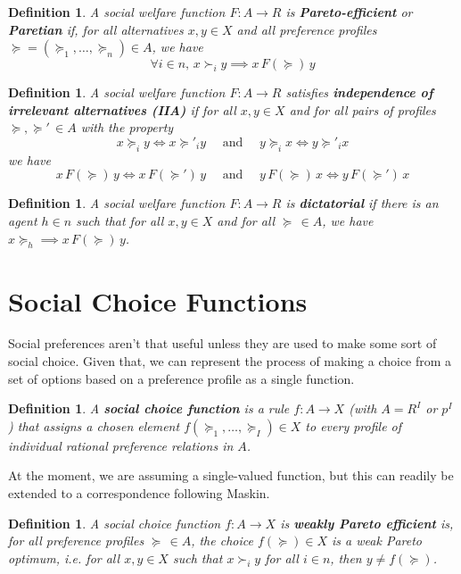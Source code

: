 \documentclass[letter, 10pt]{article}
\newtheorem{definition}[theorem]{Definition}
\theoremstyle{definition}
\begin{document}
\begin{spacing}{1.1}
\begin{definition}
  A social welfare function $F:A\to R$ is
  \textbf{Pareto-efficient} or
  \textbf{Paretian} if, for all alternatives
  $x,y \in X$ and all preference profiles
  $\succeq=(\succeq_1, \ldots, \succeq_n)\in A$, we have \[\forall
  i\in n, \, x \succ_i y \implies x \, F(\succeq) \, y\]
\end{definition}

\begin{definition}
  A social welfare function $F:A\to R$ satisfies
  \textbf{independence of irrelevant alternatives (IIA)}  if for
  all $x,y \in X$ and for all pairs of profiles
  $\succeq , \succeq'\, \in A$ with the property \[x\succeq_i y
  \iff x\succeq'_i y \quad\text{ and }\quad y \succeq_i x \iff y
  \succeq'_i x\] we have \[x\, F(\succeq) \, y \iff x
  \,F(\succeq')\, y \quad\text{ and }\quad y\, F(\succeq) \, x \iff y
  \,F(\succeq')\, x\]
\end{definition}

\begin{definition}
  A social welfare function $F: A\to R$ is
  \textbf{dictatorial} if there is an agent $h\in n$ such
  that for all $x,y \in X$ and for all $\succeq \,\in A$, we
  have $x \succeq_h \implies x\, F(\succeq) \, y$.
\end{definition}

\section{Social Choice Functions}

Social preferences aren't that useful unless they are
used to make some sort of social choice. Given that, we
can represent the process of making a choice from a set
of options based on a preference profile as a single function.

\begin{definition}
  A \textbf{social choice function} is a rule $f: A\to X$
  (with $A = R^I$ or $p^I$) that assigns a chosen element
  $f(\succeq_1, \ldots, \succeq_I) \in X$ to every profile
  of individual rational preference relations in $A$.
\end{definition}

At the moment, we are assuming a single-valued function,
but this can readily be extended to a correspondence following Maskin.

\begin{definition}
  A social choice function $f: A \to X$ is \textbf{weakly
    Pareto efficient} is, for all preference profiles
  $\succeq\, \in A$, the choice $f(\succeq) \in X$ is a
  weak Pareto optimum, i.e. for all $x,y\in X$ such that
  $x \succ_i y$ for all $i\in n$, then $y \not = f(\succeq)$.
\end{definition}


\end{spacing}
\end{document}
